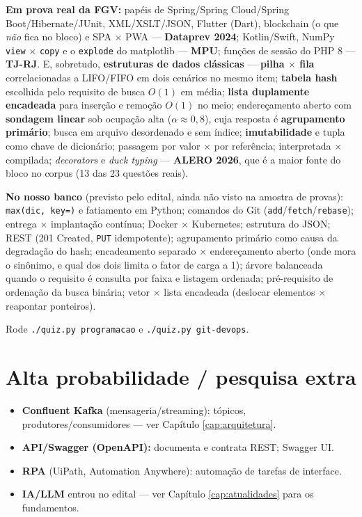 \begin{jacaiu}
\textbf{Em prova real da FGV:} papéis de Spring/Spring Cloud/Spring
Boot/Hibernate/JUnit, XML/XSLT/JSON, Flutter (Dart), blockchain (o que
\emph{não} fica no bloco) e SPA $\times$ PWA --- \textbf{Dataprev 2024};
Kotlin/Swift, NumPy \texttt{view} $\times$ \texttt{copy} e o
\texttt{explode} do matplotlib --- \textbf{MPU}; funções de sessão do PHP 8
--- \textbf{TJ-RJ}. E, sobretudo, \textbf{estruturas de dados clássicas} ---
\textbf{pilha $\times$ fila} correlacionadas a LIFO/FIFO em dois cenários no
mesmo item; \textbf{tabela hash} escolhida pelo requisito de busca $O(1)$ em
média; \textbf{lista duplamente encadeada} para inserção e remoção $O(1)$ no
meio; endereçamento aberto com \textbf{sondagem linear} sob ocupação alta
($\alpha \approx 0{,}8$), cuja resposta é \textbf{agrupamento primário};
busca em arquivo desordenado e sem índice; \textbf{imutabilidade} e tupla
como chave de dicionário; passagem por valor $\times$ por referência;
interpretada $\times$ compilada; \emph{decorators} e \emph{duck typing} ---
\textbf{ALERO 2026}, que é a maior fonte do bloco no corpus (13 das 23
questões reais).

\textbf{No nosso banco} (previsto pelo edital, ainda não visto na amostra de
provas): \texttt{max(dic, key=)} e fatiamento em Python; comandos do Git
(\texttt{add}/\texttt{fetch}/\texttt{rebase}); entrega $\times$ implantação
contínua; Docker $\times$ Kubernetes; estrutura do JSON; REST (201 Created,
\texttt{PUT} idempotente); agrupamento primário como causa da degradação do
hash; encadeamento separado $\times$ endereçamento aberto (onde mora o
sinônimo, e qual dos dois limita o fator de carga a 1); árvore balanceada
quando o requisito é consulta por faixa e listagem ordenada; pré-requisito de
ordenação da busca binária; vetor $\times$ lista encadeada (deslocar elementos
$\times$ reapontar ponteiros).

Rode \texttt{./quiz.py programacao} e \texttt{./quiz.py git-devops}.
\end{jacaiu}

\section{Alta probabilidade / pesquisa extra}

\begin{itemize}
\item \textbf{Confluent Kafka} (mensageria/streaming): tópicos,
produtores/consumidores --- ver Capítulo \ref{cap:arquitetura}.
\item \textbf{API/Swagger (OpenAPI):} documenta e contrata REST; Swagger UI.
\item \textbf{RPA} (UiPath, Automation Anywhere): automação de tarefas de
interface.
\item \textbf{IA/LLM} entrou no edital --- ver Capítulo \ref{cap:atualidades}
para os fundamentos.
\end{itemize}

